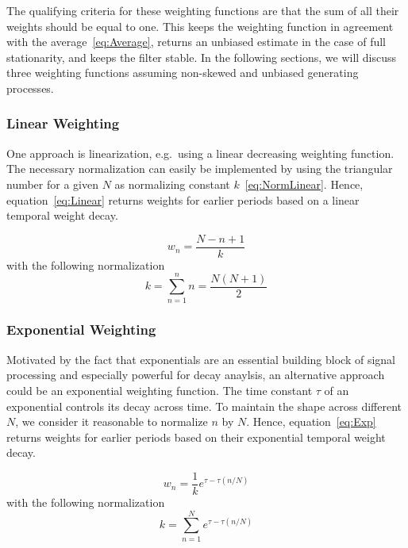 \documentclass[a4paper]{article}
\begin{document}
The qualifying criteria for these weighting functions are that the sum of all their weights should be equal to one. This keeps the weighting function in agreement with the average~\eqref{eq:Average}, returns an unbiased estimate in the case of full stationarity, and keeps the filter stable. In the following sections, we will discuss three weighting functions assuming non-skewed and unbiased generating processes.

\subsubsection{Linear Weighting}

One approach is linearization, e.g.\ using a linear decreasing weighting function.  The necessary normalization can easily be implemented by using the triangular number for a given $N$ as normalizing constant $k$~\eqref{eq:NormLinear}. Hence, equation~\eqref{eq:Linear} returns weights for earlier periods based on a linear temporal weight decay.

\begin{equation}
    w_n = \frac{N-n+1}{k}\label{eq:Linear}
\end{equation}
with the following normalization
\begin{equation}
    k  = \sum_{n=1}^{n} n = \frac{N(N+1)}{2}\label{eq:NormLinear}
\end{equation}

\subsubsection{Exponential Weighting}

Motivated by the fact that exponentials are an essential building block of signal processing and especially powerful for decay anaylsis, an alternative approach could be an exponential weighting function. The time constant $\tau$ of an exponential controls its decay across time. To maintain the shape across different $N$, we consider it reasonable to normalize $n$ by $N$. Hence, equation~\eqref{eq:Exp} returns weights for earlier periods based on their exponential temporal weight decay.

\begin{equation}
    w_n = \frac{1}{k} e^{\tau-\tau{(n/N)}}\label{eq:Exp}
\end{equation}
with the following normalization
\begin{equation}
    k  = \sum_{n=1}^{N} e^{\tau-\tau{(n/N)}}\label{eq:NormExp}
\end{equation}
\end{document}
